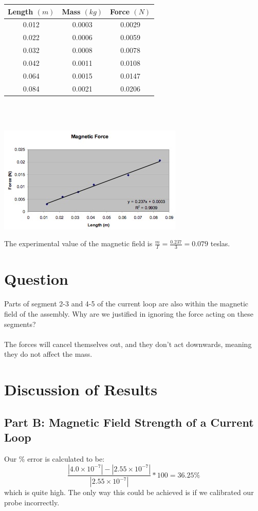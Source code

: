 \documentclass[titlepage]{article}
\begin{document}
\begin{center}\label{tbl12}
	\begin{tabular}{ccc}
	\hline
	Length $(m)$ & Mass $(kg)$ & Force $(N)$\\
	\hline
	0.012 & 0.0003 & 0.0029\\
	\hline
	0.022 & 0.0006 & 0.0059\\
	\hline
	0.032 & 0.0008 & 0.0078\\
	\hline
	0.042 & 0.0011 & 0.0108\\
	\hline
	0.064 & 0.0015 & 0.0147\\
	\hline
	0.084 & 0.0021 & 0.0206\\
	\hline
	\end{tabular}
\end{center}\\
\\
\begin{center}\label{g4}
	\includegraphics{4.jpg}
\end{center}
The experimental value of the magnetic field is $\frac{m}{I} = \frac{0.237}{3} = 0.079$ teslas.

\section{Question}\label{sec:question}
Parts of segment 2-3 and 4-5 of the current loop are also within the magnetic field of the assembly. Why are we justified in ignoring the force acting on these segments?\\
\\
The forces will cancel themselves out, and they don't act downwards, meaning they do not affect the mass.

\section{Discussion of Results}\label{sec:discussion_of_results}

\subsection{Part B: Magnetic Field Strength of a Current Loop}\label{sub:part_b_magnetic_field_strength_of_a_current_loop-dor}
Our \% error is calculated to be:
\[
	\frac{|4.0 \times 10^{-7}| - |2.55 \times 10^{-7}|}{|2.55 \times 10^{-7}|} * 100 = 36.25\%
\]
which is quite high. The only way this could be achieved is if we calibrated our probe incorrectly.
\end{document}
